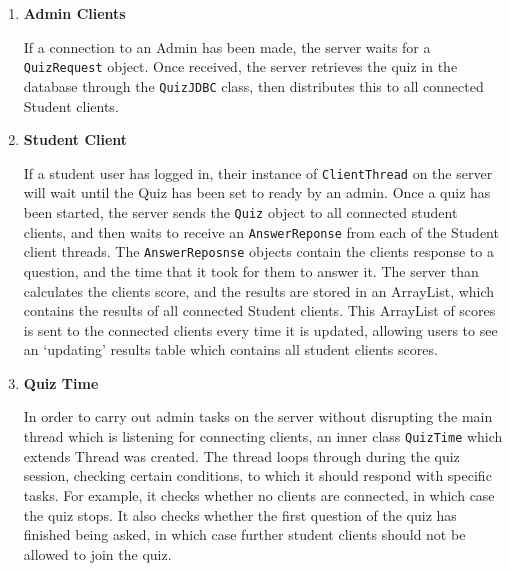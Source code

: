 \begin{enumerate}
	\item \textbf{Admin Clients}

	If a connection to an Admin has been made, the server waits for a
	\texttt{QuizRequest} object. Once received, the server retrieves the quiz
	in the database through the \texttt{QuizJDBC} class, then distributes this
	to all connected Student clients.

	\item \textbf{Student Client}

	If a student user has logged in, their instance of \texttt{ClientThread} on
	the server will wait until the Quiz has been set to ready by an admin.
	Once a quiz has been started, the server sends the \texttt{Quiz} object to
	all connected student clients, and then waits to receive an
	\texttt{AnswerReponse} from each of the Student client threads. The
	\texttt{AnswerReposnse} objects contain the clients response to a question,
	and the time that it took for them to answer it. The server than
	calculates the clients score, and the results are stored in an ArrayList,
	which contains the results of all connected Student clients. This
	ArrayList of scores is sent to the connected clients every time it is
	updated, allowing users to see an `updating' results table which contains
	all student clients scores.

	\item \textbf{Quiz Time}

	In order to carry out admin tasks on the server without disrupting the main
	thread which is listening for connecting clients, an inner class
	\texttt{QuizTime} which extends Thread was created. The thread loops
	through during the quiz session, checking certain conditions, to which it
	should respond with specific tasks. For example, it checks whether no
	clients are connected, in which case the quiz stops. It also checks whether
	the first question of the quiz has finished being asked, in which case
	further student clients should not be allowed to join the quiz.

\end{enumerate}
